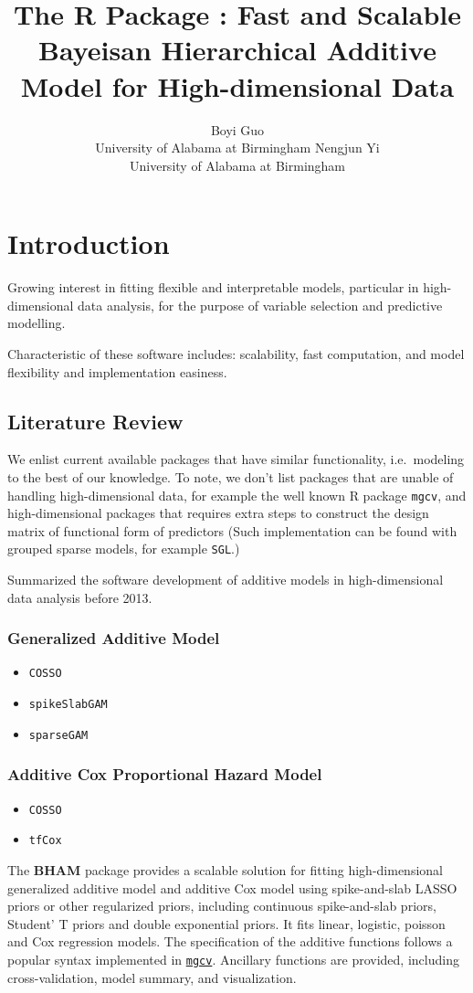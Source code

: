 \documentclass[
]{jss}
\author{
Boyi Guo\\University of Alabama at Birmingham \And Nengjun
Yi\\University of Alabama at Birmingham
}
\title{The R Package \pkg{BHAM}: Fast and Scalable Bayeisan Hierarchical
Additive Model for High-dimensional Data}
\begin{document}
\section{Introduction}

Growing interest in fitting flexible and interpretable models,
particular in high-dimensional data analysis, for the purpose of
variable selection and predictive modelling.

Characteristic of these software includes: scalability, fast
computation, and model flexibility and implementation easiness.

\subsection{Literature Review}

We enlist current available packages that have similar functionality,
i.e.~modeling to the best of our knowledge. To note, we don't list
packages that are unable of handling high-dimensional data, for example
the well known R package \texttt{mgcv}, and high-dimensional packages
that requires extra steps to construct the design matrix of functional
form of predictors (Such implementation can be found with grouped sparse
models, for example \texttt{SGL}.)

\cite{Scheipl2013} Summarized the software development of additive
models in high-dimensional data analysis before 2013.

\subsubsection{Generalized Additive Model}
\begin{itemize}
\item \texttt{COSSO}
\item \texttt{spikeSlabGAM}
\item \texttt{sparseGAM}
\end{itemize}

\subsubsection{Additive Cox Proportional Hazard Model}
\begin{itemize}
\item \texttt{COSSO}
\item \texttt{tfCox}
\end{itemize}

The \textbf{BHAM} package provides a scalable solution for fitting
high-dimensional generalized additive model and additive Cox model using
spike-and-slab LASSO priors or other regularized priors, including
continuous spike-and-slab priors, Student' T priors and double
exponential priors. It fits linear, logistic, poisson and Cox regression
models. The specification of the additive functions follows a popular
syntax implemented in
\href{https://cran.r-project.org/web/packages/mgcv/index.html}{\texttt{mgcv}}.
Ancillary functions are provided, including cross-validation, model
summary, and visualization.
\end{document}
